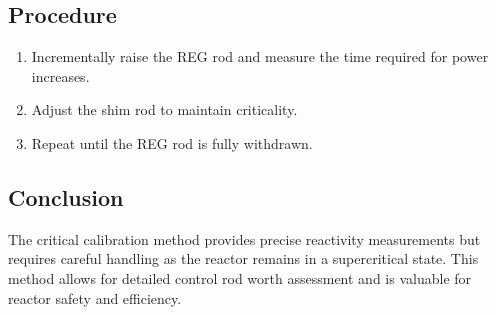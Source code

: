 \subsection{Procedure}
\begin{enumerate}
    \item Incrementally raise the REG rod and measure the time required for power increases.
    \item Adjust the shim rod to maintain criticality.
    \item Repeat until the REG rod is fully withdrawn.
\end{enumerate}

\subsection{Conclusion}
The critical calibration method provides precise reactivity measurements but requires careful handling as the reactor remains in a supercritical state. This method allows for detailed control rod worth assessment and is valuable for reactor safety and efficiency.